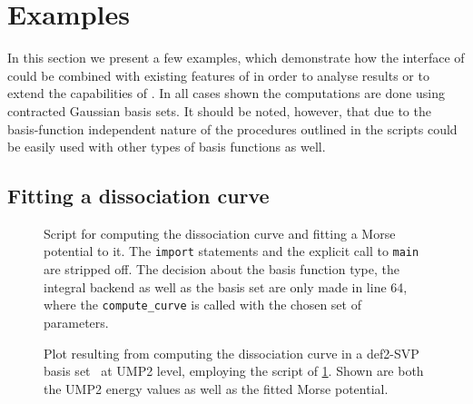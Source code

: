 %
\newcommand{\scipy}{\texttt{scipy}\xspace}

\section{Examples}
\label{sec:examples}

In this section we present a few examples,
which demonstrate how the \python interface of \molsturm
could be combined with existing features of \python
in order to analyse results or to extend the capabilities of \molsturm.
In all cases shown the computations are done using contracted
Gaussian basis sets.
It should be noted, however,
that due to the basis-function independent nature of \molsturm
the procedures outlined in the scripts could be easily used
with other types of basis functions as well.

\subsection{Fitting a dissociation curve}
\label{sec:ex:data}

\newcommand{\ldict}{59--63\xspace}
\newcommand{\lcall}{64\xspace}
\newcommand{\lextract}{34\xspace}

\begin{figure}
	\begin{minipage}{0.44\textwidth}
	
	\end{minipage}
	\hspace{15pt}
	\begin{minipage}{0.48\textwidth}
	
	\end{minipage}
	\caption{
		Script for computing the  dissociation curve
		and fitting a Morse potential to it.
		The \texttt{import} statements and the explicit call to \texttt{main}
		are stripped off.
		The decision about the basis function type, the integral backend
		as well as the basis set are only made in line \lcall,
		where the \texttt{compute\_curve} is called with the chosen
		set of parameters.
	}
	\label{fig:codeDissociation}
\end{figure}



\begin{figure}
	\centering
	\caption{
		Plot resulting from computing the 
		dissociation curve in a def2-SVP basis set~\cite{Weigend2005}
		at UMP2 level,
		employing the script of \fig \ref{fig:codeDissociation}.
		Shown are both the UMP2 energy values as well as the fitted
		Morse potential.}
	\label{fig:dissociation}
\end{figure}

